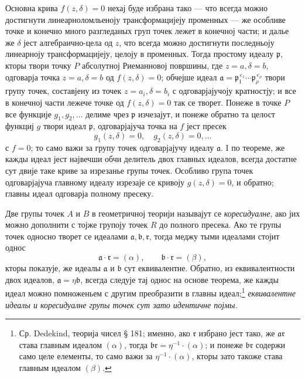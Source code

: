 ﻿\documentclass[11pt]{article}
\providecommand{\fra}{\mathfrak a}
\providecommand{\frb}{\mathfrak b}
\providecommand{\frp}{\mathfrak p}
\providecommand{\frr}{\mathfrak r}
\begin{document}
Основна крива \(f(z,\delta)=0\) нехај буде избрана тако --- что всегда можно достигнути линеарноломльеноју трансформацијеју променных --- же особливе точке и конечно много разгледаных груп точек лежет в конечној части; и далье же \(\delta\) јест алгебраично-цела од \(z\), что всегда можно достигнути последньоју линеарноју трансформацијеју, целоју в променных. Тогда простому идеалу \(\frp\), кторы твори точку \(P\) абсолутној Риеманновој површины, где \(z=a,\delta=b\), одговарја точка \(z=a,\delta=b\) од \(f(z,\delta)=0\); обчејше идеал \(\fra=\frp_1^{\,e_1}\cdots\frp_\rho^{\,e_\rho}\) твори групу точек, составјену из точек \(z=a_i,\delta=b_i\) с одговарјајучоју кратностју; и все в конечној части лежече точке од \(f(z,\delta)=0\) так се творет. Понеже в точке \(P\) все функције \(g_1,g_2,\ldots\) делиме чрез \(\frp\) изчезајут, и понеже обратно та целост функциј \(g\) твори идеал \(\frp\), одговарјајуча точка на \(f\) јест пресек
\[
g_1(z,\delta)=0,\quad g_2(z,\delta)=0,\ldots
\]
с \(f=0\); то само важи за групу точек одговарјајучу идеалу \(\fra\). I по теореме, же кажды идеал јест највечши обчи делитель двох главных идеалов, всегда достатне сут двије таке криве за изрезанье групы точек. Особливо група точек одговарјајуча главному идеалу изрезаје се кривоју \(g(z,\delta)=0\), и обратно; главны идеал одговарја полному пресеку.

Две групы точек \(A\) и \(B\) в геометричној теорији называјут се {\itshape коресидуалне}, ако јих можно дополнити с тојже групоју точек \(R\) до полного пресека. Ако те групы точек односно творет се идеалами \(\fra,\frb,\frr\), тогда меджу тыми идеалами стојит однос
\[
\fra\cdot\frr=(\alpha),\qquad \frb\cdot\frr=(\beta),
\]
кторы показује, же идеалы \(\fra\) и \(\frb\) сут еквивалентне. Обратно, из еквивалентности двох идеалов, \(\fra=\eta\frb\), всегда следује тај однос на основе теорема, же кажды идеал можно помноженьем с другим преобразити в главны идеал;\footnote{Ср. Dedekind, теорија чисел § 181; именно, ако \(\frr\) избрано јест тако, же \(\fra\frr\) става главным идеалом \((\alpha)\), тогда \(\frb\frr=\eta^{-1}\cdot(\alpha)\); и понеже \(\frb\frr\) содержи само целе елементы, то само важи за \(\eta^{-1}\cdot(\alpha)\), кторы зато такоже става главным идеалом \((\beta)\).} {\itshape еквивалентне идеалы и коресидуалне групы точек сут зато идентичне појмы.}
\end{document}
